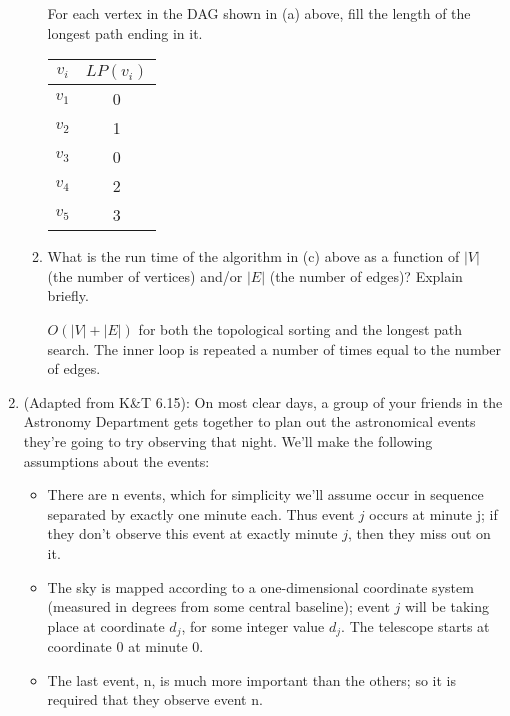 \documentclass[letterpaper, 11pt]{article}
\begin{document}
\begin{enumerate}
\begin{enumerate}
        For each vertex in the DAG shown in (a) above, fill the length of the longest path ending in it.
        \begin{table}[H]
            \centering
            \begin{tabular}{|c|c|}
                \hline
                $v_i$ & $LP(v_i)$ \\
                \hline
                $v_1$ & 0 \\
                \hline
                $v_2$ & 1 \\
                \hline
                $v_3$ & 0 \\
                \hline
                $v_4$ & 2 \\
                \hline
                $v_5$ & 3 \\
                \hline
            \end{tabular}
        \end{table}

        \item What is the run time of the algorithm in (c) above as a function of $|V|$ (the number of vertices) and/or $|E|$ (the number of edges)? Explain briefly.

        $O(|V| + |E|)$ for both the topological sorting and the longest path search. The inner loop is repeated a number of times equal to the number of edges.
    \end{enumerate}

    \item (Adapted from K\&T 6.15): On most clear days, a group of your friends in the Astronomy Department gets together to plan out the astronomical events they’re going to try observing that night. We’ll make the following assumptions about the events:

    \begin{itemize}
        \item There are n events, which for simplicity we’ll assume occur in sequence separated by exactly one minute each. Thus event $j$ occurs at minute j; if they don’t observe this event at exactly minute $j$, then they miss out on it.
        \item The sky is mapped according to a one-dimensional coordinate system (measured in degrees from some central baseline); event $j$ will be taking place at coordinate $d_j$, for some integer value $d_j$. The telescope starts at coordinate 0 at minute 0.
        \item The last event, n, is much more important than the others; so it is required that they observe event n.
    \end{itemize}


\end{enumerate}
\end{document}
